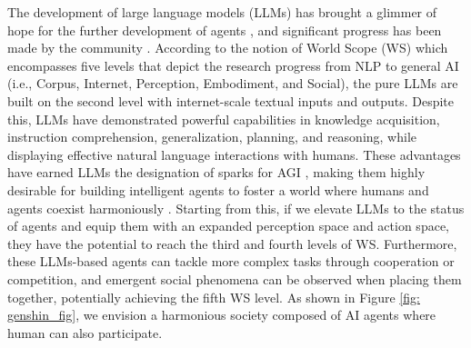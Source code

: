 \documentclass{article}
\begin{document}
The development of large language models (LLMs) has brought a glimmer of hope for the further development of agents \cite{DBLP:conf/nips/Ouyang0JAWMZASR22,DBLP:journals/corr/abs-2303-08774,DBLP:journals/tmlr/WeiTBRZBYBZMCHVLDF22}, and significant progress has been made by the community \cite{DBLP:journals/corr/abs-2304-03442,DBLP:journals/corr/abs-2305-16960,DBLP:journals/corr/abs-2309-02427,weng2023prompt}. According to the notion of World Scope (WS) \cite{DBLP:conf/emnlp/BiskHTABCLLMNPT20} which encompasses five levels that depict the research progress from NLP to general AI (i.e., Corpus, Internet, Perception, Embodiment, and Social), the pure LLMs are built on the second level with internet-scale textual inputs and outputs. 
Despite this, LLMs have demonstrated powerful capabilities in knowledge acquisition, instruction comprehension, generalization, planning, and reasoning, while displaying effective natural language interactions with humans. These advantages have earned LLMs the designation of sparks for AGI \cite{DBLP:journals/corr/abs-2303-12712}, making them highly desirable for building intelligent agents to foster a world where humans and agents coexist harmoniously \cite{DBLP:journals/corr/abs-2304-03442}. 
Starting from this, if we elevate LLMs to the status of agents and equip them with an expanded perception space and action space, they have the potential to reach the third and fourth levels of WS. Furthermore, these LLMs-based agents can tackle more complex tasks through cooperation or competition, and emergent social phenomena can be observed when placing them together, potentially achieving the fifth WS level. As shown in Figure \ref{fig: genshin_fig}, we envision a harmonious society composed of AI agents where human can also participate.


\end{document}
